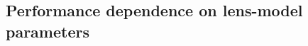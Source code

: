 \documentclass{emulateapj}
\begin{document}







\subsection{Performance dependence on lens-model parameters}
\end{document}
